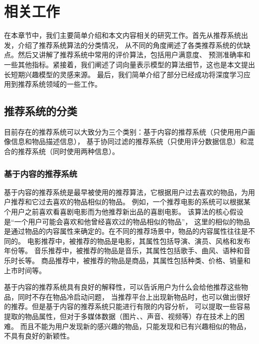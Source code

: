 \chapter{相关工作}
在本章节中，我们主要简单介绍和本文内容相关的研究工作。首先从推荐系统出发，介绍了推荐系统算法的分类情况，
从不同的角度阐述了各类推荐系统的优缺点。然后又讲解了推荐系统中常用的评价算法，包括用户满意度、
预测准确率和一些其他指标。紧接着，我们阐述了词向量表示模型的算法细节，这也是本文提出长短期兴趣模型的灵感来源。
最后，我们简单介绍了部分已经成功将深度学习应用到推荐系统领域的一些工作。

\section{推荐系统的分类}
目前存在的推荐系统可以大致分为三个类别：基于内容的推荐系统（只使用用户画像信息和物品描述信息），
基于协同过滤的推荐系统（只使用评分数据信息）和混合的推荐系统（同时使用两种信息）。

\subsection{基于内容的推荐系统}
基于内容的推荐系统是最早被使用的推荐算法，它根据用户过去喜欢的物品，为用户推荐和它过去喜欢的物品相似的物品。
例如，一个推荐电影的系统可以根据某个用户之前喜欢看喜剧电影而为他推荐新出品的喜剧电影。
该算法的核心假设是``一个用户可能会喜欢和他曾经喜欢过的物品相似的物品''，
这里的相似的物品是通过物品的内容属性来确定的。在不同的推荐场景中，物品的内容属性往往是不同的。
电影推荐中，被推荐的物品是电影，其属性包括导演、演员、风格和发布年份等。
音乐推荐中，被推荐的物品是音乐，其属性包括歌手、曲风、语种和音乐时长等。
商品推荐中，被推荐的物品是商品，其属性包括种类、价格、销量和上市时间等。

基于内容的推荐系统具有良好的解释性，可以告诉用户为什么会给他推荐这些物品，同时不存在物品冷启动问题，
当推荐平台上出现新物品时，也可以做出很好的推荐。但是基于内容的推荐系统只能进行有限的内容分析，
可以提取一些容易提取的物品属性，但对于多媒体数据（图片、、声音、视频等）存在技术上的困难。
而且不能为用户发现新的感兴趣的物品，只能发现和已有兴趣相似的物品，不具有良好的新颖性。

